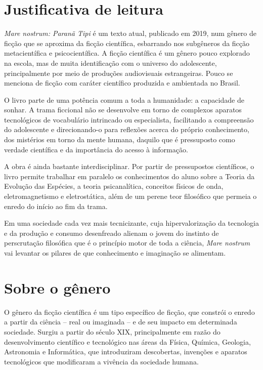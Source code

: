 \documentclass[12pt]{extarticle}
\begin{document}
\tableofcontents


\section{Justificativa de leitura}
\textit{Mare nostrum: Paranã Tipi} é um texto atual, publicado em 2019, num gênero de ficção que se aproxima da ficção científica, esbarrando nos subgêneros da ficção metacientífica e psicocientífica. A ficção científica é um gênero pouco explorado na escola, mas de muita identificação com o universo do adolescente, principalmente por meio de produções audiovisuais estrangeiras. Pouco se menciona de ficção com caráter científico produzida e ambientada no Brasil.

O livro parte de uma potência comum a toda a humanidade: a capacidade de sonhar. A trama ficcional não se desenvolve em torno de complexos aparatos tecnológicos de vocabulário intrincado ou especialista, facilitando a compreensão do adolescente e direcionando-o para reflexões acerca do próprio conhecimento, dos mistérios em torno da mente humana, daquilo que é pressuposto como verdade científica e da importância do acesso à informação. 

A obra é ainda bastante interdisciplinar. Por partir de pressupostos científicos, o livro permite trabalhar em paralelo os conhecimentos do aluno sobre a Teoria da Evolução das Espécies, a teoria psicanalítica, conceitos físicos de onda, eletromagnetismo e eletrostática, além de um perene teor filosófico que permeia o enredo do início ao fim da trama.

Em uma sociedade cada vez mais tecnicizante, cuja hipervalorização da tecnologia e da produção e consumo desenfreado alienam o jovem do instinto de perscrutação filosófica que é o princípio motor de toda a ciência, \emph{Mare nostrum} vai levantar os pilares de que conhecimento e imaginação se alimentam.

\section{Sobre o gênero}
O gênero da ficção científica é um tipo específico de ficção, que constrói o enredo a partir da ciência – real ou imaginada – e de seu impacto em determinada sociedade. Surgiu a partir do século {XIX}, principalmente em razão do desenvolvimento científico e tecnológico nas áreas da Física, Química, Geologia, Astronomia e Informática, que introduziram descobertas, invenções e aparatos tecnológicos que modificaram a vivência da sociedade humana.
\end{document}
